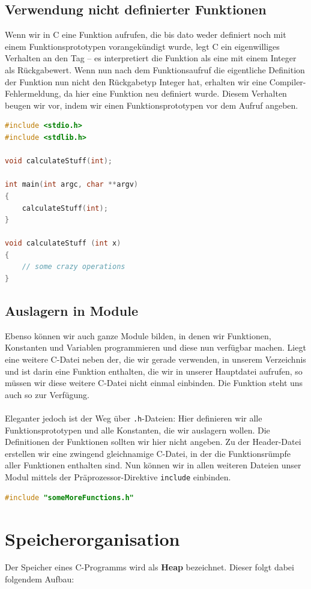 \documentclass[11pt,a4paper]{scrartcl}
\begin{document}
\subsection{Verwendung nicht definierter Funktionen} 
Wenn wir in C eine Funktion aufrufen, die bis dato weder definiert noch mit einem Funktionsprototypen {\glqq}vorangekündigt{\grqq} wurde, legt C ein eigenwilliges Verhalten an den Tag -- es interpretiert die Funktion als eine mit einem Integer als Rückgabewert. Wenn nun nach dem Funktionsaufruf die eigentliche Definition der Funktion nun nicht den Rückgabetyp Integer hat, erhalten wir eine Compiler-Fehlermeldung, da hier eine Funktion neu definiert wurde. Diesem Verhalten beugen wir vor, indem wir einen Funktionsprototypen vor dem Aufruf angeben.
\begin{lstlisting}[language=C]
#include <stdio.h>
#include <stdlib.h>

void calculateStuff(int);

int main(int argc, char **argv) 
{
	calculateStuff(int);
}

void calculateStuff (int x) 
{
	// some crazy operations
}
\end{lstlisting}

\subsection{Auslagern in Module}
Ebenso können wir auch ganze Module bilden, in denen wir Funktionen, Konstanten und Variablen programmieren und diese nun verfügbar machen. Liegt eine weitere C-Datei neben der, die wir gerade verwenden, in unserem Verzeichnis und ist darin eine Funktion enthalten, die wir in unserer Hauptdatei aufrufen, so müssen wir diese weitere C-Datei nicht einmal einbinden. Die Funktion steht uns auch so zur Verfügung. \\\\
Eleganter jedoch ist der Weg über \texttt{.h}-Dateien: Hier definieren wir alle Funktionsprototypen und alle Konstanten, die wir auslagern wollen. Die Definitionen der Funktionen sollten wir hier nicht angeben. Zu der Header-Datei erstellen wir eine zwingend gleichnamige C-Datei, in der die Funktionsrümpfe aller Funktionen enthalten sind. Nun können wir in allen weiteren Dateien unser Modul mittels der Präprozessor-Direktive \texttt{include} einbinden.
\begin{lstlisting}[language=C]
#include "someMoreFunctions.h"
\end{lstlisting}
\section{Speicherorganisation}
Der Speicher eines C-Programms wird als \textbf{Heap} bezeichnet. Dieser folgt dabei folgendem Aufbau:
\end{document}
